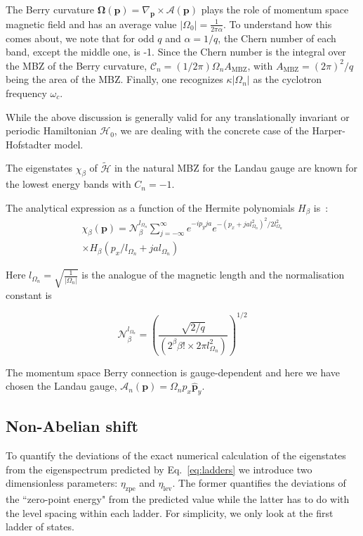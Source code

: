 \documentclass[twocolumn, 10pt, aps, superscriptaddress, floatfix, showpacs, pra, citeautoscript]{revtex4-1}
\newcommand{\vt}[1]{\mathbf{#1}}
\begin{document}
The Berry curvature
$\vt{\Omega}(\vt{p}) = \nabla_{\vt{p}} \times \mathcal{A}(\vt{p})$
plays the role of momentum space magnetic field and has an average
value $|\Omega_0| = \frac{1}{2\pi\alpha}$. To understand how this
comes about, we note that for odd $q$ and $\alpha = 1/q$, the Chern
number of each band, except the middle one, is -1. Since the Chern
number is the integral over the MBZ of the Berry curvature,
$\mathcal{C}_n = (1/2\pi) \Omega_n A_{\text{MBZ}}$, with
$A_{\text{MBZ}} = (2\pi)^2/q$ being the area of the MBZ.
%
Finally, one recognizes $\kappa |\Omega_n|$ as the cyclotron frequency
$\omega_c$.

While the above discussion is generally valid for any translationally
invariant or periodic Hamiltonian $\mathcal{H}_0$, we are dealing with
the concrete case of the Harper-Hofstadter model.

The eigenstates $\chi_\beta$ of $\widetilde{\mathcal{H}}$ in the
natural MBZ for the Landau gauge are known for the lowest energy bands
with $C_n = -1$.

The analytical expression as a function of the Hermite polynomials
$H_\beta$ is~\cite{price2014magnetic}:
%
\begin{multline}\label{eq:chi}
 \chi_\beta (\vt{p}) = \mathcal{N}_\beta^{l_{\Omega_n}} \sum_{j = -
 \infty}^{\infty} e^{- i p_y j a} e^{ - ( p_x + j a l_{\Omega_n}^2 )
 ^2 / 2 l_{\Omega_n}^2}\\
 \times H_\beta ( p_x / l_{\Omega_n} + j a
 l_{\Omega_n})
\end{multline}

Here $l_{\Omega_n} = \sqrt{\frac{1}{|\Omega_n|}}$ is the analogue of
the magnetic length and the normalisation constant is

\begin{equation}
\mathcal{N}_\beta^{l_{\Omega_n}} = \left( \frac{\sqrt{2/q}} {(2^\beta
\beta! \times 2 \pi l_{\Omega_n}^2)} \right)^{1/2}
\end{equation}

The momentum space Berry connection is gauge-dependent and here we
have chosen the Landau gauge,
$\mathcal{A}_n(\mathbf{p}) = \Omega_n p_x \hat{\vt{p}}_y$.


\subsection{Non-Abelian shift}\label{sec:non-abelian-shift}
To quantify the deviations of the exact numerical calculation of the
eigenstates from the eigenspectrum predicted by Eq.~\eqref{eq:ladders}
we introduce two dimensionless parameters: $\eta_{\text{zpe}}$ and
$\eta_{\text{lev}}$. The former quantifies the deviations of the
``zero-point energy" from the predicted value while the latter has to
do with the level spacing within each ladder. For simplicity, we only
look at the first ladder of states.
\end{document}
